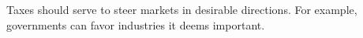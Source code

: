 Taxes should serve to steer markets in desirable directions.
For example, governments can favor industries it deems important.